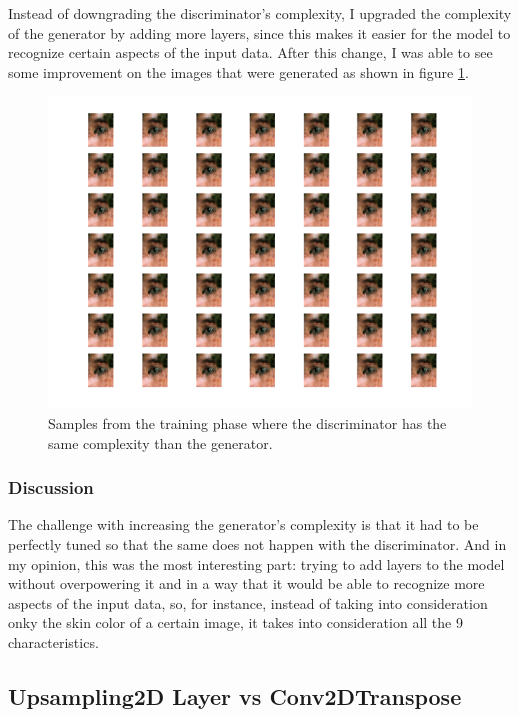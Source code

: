 \documentclass[12pt,a4paper,oneside]{memoir}
\begin{document}
Instead of downgrading the discriminator's complexity, I upgraded the complexity of the generator by adding more layers, since this makes it easier for the model to recognize certain aspects of the input data. After this change, I was able to see some improvement on the images that were generated as shown in figure \ref{fig:samecomp}.



\begin{figure}[H]
\centering
\includegraphics[width=1\textwidth]{images/same_complex.png}
\caption{Samples from the training phase where the discriminator has the same complexity than the generator.}
\centering
\label{fig:samecomp}
\end{figure}
 


\subsubsection{Discussion}
The challenge with increasing the generator's complexity is that it had to be perfectly tuned so that the same does not happen with the discriminator. And in my opinion, this was the most interesting part: trying to add layers to the model without overpowering it and in a way that it would be able to recognize more aspects of the input data, so, for instance, instead of taking into consideration onky the skin color of a certain image, it takes into consideration all the 9 characteristics.




\subsection{Upsampling2D Layer vs Conv2DTranspose}
\end{document}
